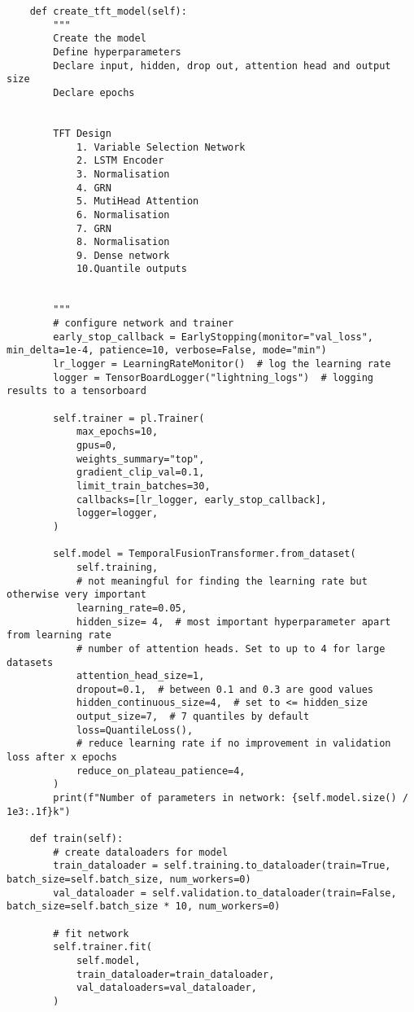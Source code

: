 \documentclass{article}
\begin{document}
\begin{lstlisting}
    def create_tft_model(self):
        """
        Create the model
        Define hyperparameters
        Declare input, hidden, drop out, attention head and output size
        Declare epochs


        TFT Design
            1. Variable Selection Network
            2. LSTM Encoder
            3. Normalisation
            4. GRN
            5. MutiHead Attention
            6. Normalisation
            7. GRN
            8. Normalisation
            9. Dense network
            10.Quantile outputs


        """
        # configure network and trainer
        early_stop_callback = EarlyStopping(monitor="val_loss", min_delta=1e-4, patience=10, verbose=False, mode="min")
        lr_logger = LearningRateMonitor()  # log the learning rate
        logger = TensorBoardLogger("lightning_logs")  # logging results to a tensorboard

        self.trainer = pl.Trainer(
            max_epochs=10,
            gpus=0,
            weights_summary="top",
            gradient_clip_val=0.1,
            limit_train_batches=30,
            callbacks=[lr_logger, early_stop_callback],
            logger=logger,
        )

        self.model = TemporalFusionTransformer.from_dataset(
            self.training,
            # not meaningful for finding the learning rate but otherwise very important
            learning_rate=0.05,
            hidden_size= 4,  # most important hyperparameter apart from learning rate
            # number of attention heads. Set to up to 4 for large datasets
            attention_head_size=1,
            dropout=0.1,  # between 0.1 and 0.3 are good values
            hidden_continuous_size=4,  # set to <= hidden_size
            output_size=7,  # 7 quantiles by default
            loss=QuantileLoss(),
            # reduce learning rate if no improvement in validation loss after x epochs
            reduce_on_plateau_patience=4,
        )
        print(f"Number of parameters in network: {self.model.size() / 1e3:.1f}k")

    def train(self):
        # create dataloaders for model
        train_dataloader = self.training.to_dataloader(train=True, batch_size=self.batch_size, num_workers=0)
        val_dataloader = self.validation.to_dataloader(train=False, batch_size=self.batch_size * 10, num_workers=0)

        # fit network
        self.trainer.fit(
            self.model,
            train_dataloader=train_dataloader,
            val_dataloaders=val_dataloader,
        )


\end{lstlisting}
\end{document}
